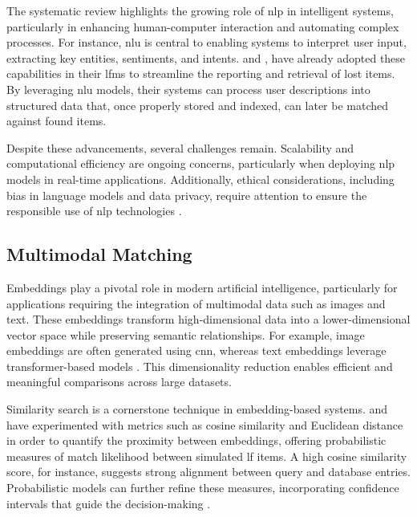 The systematic review highlights the growing role of \ac{nlp} in intelligent systems, particularly in enhancing human-computer interaction and automating complex processes. For instance, \ac{nlu} is central to enabling systems to interpret user input, extracting key entities, sentiments, and intents.  and , have already adopted these capabilities in their \ac{lfms} to streamline the reporting and retrieval of lost items. By leveraging \ac{nlu} models, their systems can process user descriptions into structured data that, once properly stored and indexed, can later be matched against found items.

Despite these advancements, several challenges remain. Scalability and computational efficiency are ongoing concerns, particularly when deploying \ac{nlp} models in real-time applications. Additionally, ethical considerations, including bias in language models and data privacy, require attention to ensure the responsible use of \ac{nlp} technologies \cite{Prawira2024}.


\subsection{Multimodal Matching} \label{subsec:multimodal-matching}

Embeddings play a pivotal role in modern artificial intelligence, particularly for applications requiring the integration of multimodal data such as images and text. These embeddings transform high-dimensional data into a lower-dimensional vector space while preserving semantic relationships. For example, image embeddings are often generated using \ac{cnn}, whereas text embeddings leverage transformer-based models \cite{He2015, Devlin2019}. This dimensionality reduction enables efficient and meaningful comparisons across large datasets.

Similarity search is a cornerstone technique in embedding-based systems.  and  have experimented with metrics such as cosine similarity and Euclidean distance in order to quantify the proximity between embeddings, offering probabilistic measures of match likelihood between simulated \ac{lf} items. A high cosine similarity score, for instance, suggests strong alignment between query and database entries. Probabilistic models can further refine these measures, incorporating confidence intervals that guide the decision-making \cite{Dosovitskiy2020}.

